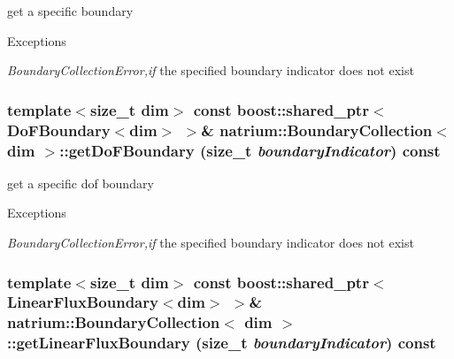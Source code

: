 get a specific boundary 
\begin{DoxyExceptions}{Exceptions}
\item[{\em BoundaryCollectionError,if}]the specified boundary indicator does not exist \end{DoxyExceptions}
\hypertarget{classnatrium_1_1BoundaryCollection_ad63f4c0e71eaa277f263d39415175549}{
\subsubsection[{getDoFBoundary}]{\setlength{\rightskip}{0pt plus 5cm}template$<$size\_\-t dim$>$ const boost::shared\_\-ptr$<${\bf DoFBoundary}$<$dim$>$ $>$\& {\bf natrium::BoundaryCollection}$<$ dim $>$::getDoFBoundary (size\_\-t {\em boundaryIndicator}) const}}
\label{classnatrium_1_1BoundaryCollection_ad63f4c0e71eaa277f263d39415175549}


get a specific dof boundary 
\begin{DoxyExceptions}{Exceptions}
\item[{\em BoundaryCollectionError,if}]the specified boundary indicator does not exist \end{DoxyExceptions}
\hypertarget{classnatrium_1_1BoundaryCollection_a7961dc115c0a8cd29fa5cf6f553aa78f}{
\subsubsection[{getLinearFluxBoundary}]{\setlength{\rightskip}{0pt plus 5cm}template$<$size\_\-t dim$>$ const boost::shared\_\-ptr$<${\bf LinearFluxBoundary}$<$dim$>$ $>$\& {\bf natrium::BoundaryCollection}$<$ dim $>$::getLinearFluxBoundary (size\_\-t {\em boundaryIndicator}) const}}
\label{classnatrium_1_1BoundaryCollection_a7961dc115c0a8cd29fa5cf6f553aa78f}


